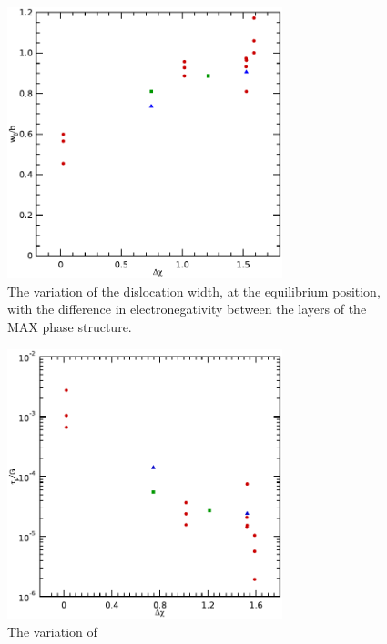 \begin{figure}
\centering
\includegraphics[width=8cm]{w0_vs_dX}
\captionsetup{width=10cm}
\caption{The variation of the dislocation width, at the equilibrium position, with the difference in electronegativity between the layers of the MAX phase structure.\label{fig:w0_vs_dX}}
\end{figure}

\begin{figure}
\centering
\includegraphics[width=8cm]{tp_vs_dX}
\caption{The variation of }
\end{figure}
















































